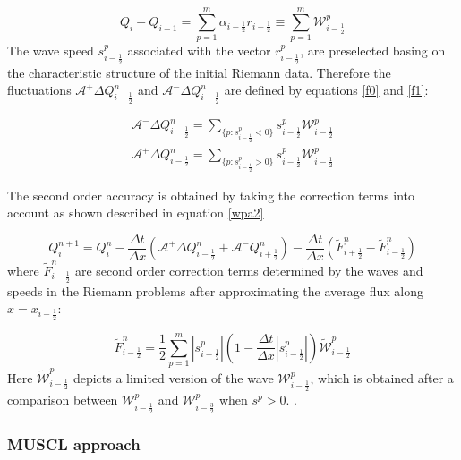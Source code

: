 \documentclass[10pt,a4paper]{article}
\newcommand{\ignore}[1]{}
\begin{document}
\begin{equation}
	Q_{i} -  Q_{i-1} = \sum_{p=1}^{m}  \alpha_{i-\frac{1}{2}} r_{i-\frac{1}{2}} \equiv \sum_{p=1}^{m} \mathcal{W}_{i-\frac{1}{2}}^{p}
	\label{wpa19}
\end{equation}
The wave speed $s_{i-\frac{1}{2}}^{p}$ associated with the vector $r_{i-\frac{1}{2}}^{p}$, are preselected basing on the characteristic structure of the initial Riemann data. Therefore the fluctuations $\mathcal{A^{+}}\Delta Q_{i-\frac{1}{2}}^{n}$  and $\mathcal{A^{-}}\Delta Q_{i-\frac{1}{2}}^{n} $ are defined by equations \eqref{f0} and \eqref{f1}:

\begin{eqnarray}
	\mathcal{A^{-}}\Delta Q_{i-\frac{1}{2}}^{n} = \sum_{\{ p:s_{i-\frac{1}{2}}^{p}<0\}} s_{i-\frac{1}{2}}^{p} \mathcal{W}_{i-\frac{1}{2}}^{p}
	\label{f0}\\
	\mathcal{A^{+}}\Delta Q_{i-\frac{1}{2}}^{n} =\sum_{\{ p:s_{i-\frac{1}{2}}^{p}>0\}} s_{i-\frac{1}{2}}^{p} \mathcal{W}_{i-\frac{1}{2}}^{p}
	\label{f1}
\end{eqnarray}

	The second order accuracy is obtained by taking the correction terms into account as shown described in equation \eqref{wpa2} 

\begin{equation}
	Q_{i}^{n+1} =  Q_{i}^{n} - \frac{\Delta t}{\Delta x}(\mathcal{A^{+}}\Delta 	Q_{i-\frac{1}{2}}^{n} + \mathcal{A^{-}}Q_{i+\frac{1}{2}}^{n}) -  \frac{\Delta t}{\Delta x} (\tilde{F}_{i+\frac{1}{2}}^{n} - \tilde{F}_{i-\frac{1}{2}}^{n} )
	\label{wpa2}
\end{equation}
where $\tilde{F}_{i-\frac{1}{2}}^{n} $ are second order correction terms determined by the waves and speeds in the Riemann problems after approximating the average flux along  $x = x_{i - \frac{1}{2}}$:

\begin{equation}
	\tilde{F}_{i-\frac{1}{2}}^{n} = \frac{1}{2} \sum_{p=1}^{m}  |s_{i- \frac{1}{2}}^{p}| \left( 1 - \frac{\Delta t}{\Delta x} |s_{i- \frac{1}{2}}^{p}|\right) \tilde{\mathcal{W}}_{i-\frac{1}{2}}^{p} 
	\label{wpa13}
\end{equation}
Here $\tilde{\mathcal{W}}_{i-\frac{1}{2}}^{p} $ depicts a limited version of the wave $\mathcal{W}_{i-\frac{1}{2}}^{p} $, which is obtained after a comparison between $\mathcal{W}_{i-\frac{1}{2}}^{p} $ and $\mathcal{W}_{i-\frac{3}{2}}^{p} $ when $s^{p} >0$. \ignore{\cite{le:1997}}.

	\subsubsection{MUSCL approach}
\end{document}
